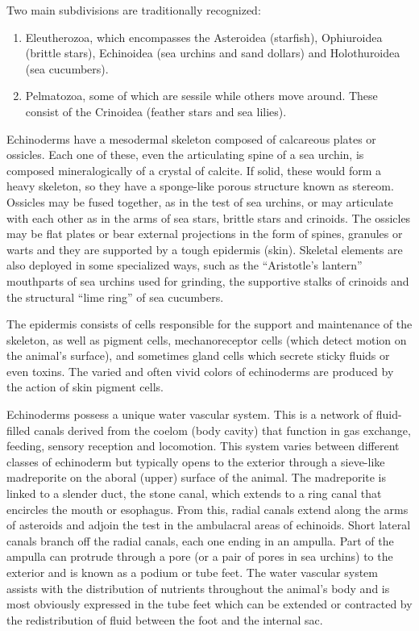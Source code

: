 \documentclass[]{book}
\providecommand{\tightlist}{%
  \setlength{\itemsep}{0pt}\setlength{\parskip}{0pt}}
\begin{document}
Two main subdivisions are traditionally recognized:

\begin{enumerate}
\def\labelenumi{\arabic{enumi}.}
\tightlist
\item
  Eleutherozoa, which encompasses the Asteroidea (starfish), Ophiuroidea (brittle stars), Echinoidea (sea urchins and sand dollars) and Holothuroidea (sea cucumbers).
\item
  Pelmatozoa, some of which are sessile while others move around. These consist of the Crinoidea (feather stars and sea lilies).
\end{enumerate}

Echinoderms have a mesodermal skeleton composed of calcareous plates or ossicles. Each one of these, even the articulating spine of a sea urchin, is composed mineralogically of a crystal of calcite. If solid, these would form a heavy skeleton, so they have a sponge-like porous structure known as stereom. Ossicles may be fused together, as in the test of sea urchins, or may articulate with each other as in the arms of sea stars, brittle stars and crinoids. The ossicles may be flat plates or bear external projections in the form of spines, granules or warts and they are supported by a tough epidermis (skin). Skeletal elements are also deployed in some specialized ways, such as the ``Aristotle's lantern'' mouthparts of sea urchins used for grinding, the supportive stalks of crinoids and the structural ``lime ring'' of sea cucumbers.

The epidermis consists of cells responsible for the support and maintenance of the skeleton, as well as pigment cells, mechanoreceptor cells (which detect motion on the animal's surface), and sometimes gland cells which secrete sticky fluids or even toxins. The varied and often vivid colors of echinoderms are produced by the action of skin pigment cells.

Echinoderms possess a unique water vascular system. This is a network of fluid-filled canals derived from the coelom (body cavity) that function in gas exchange, feeding, sensory reception and locomotion. This system varies between different classes of echinoderm but typically opens to the exterior through a sieve-like madreporite on the aboral (upper) surface of the animal. The madreporite is linked to a slender duct, the stone canal, which extends to a ring canal that encircles the mouth or esophagus. From this, radial canals extend along the arms of asteroids and adjoin the test in the ambulacral areas of echinoids. Short lateral canals branch off the radial canals, each one ending in an ampulla. Part of the ampulla can protrude through a pore (or a pair of pores in sea urchins) to the exterior and is known as a podium or tube feet. The water vascular system assists with the distribution of nutrients throughout the animal's body and is most obviously expressed in the tube feet which can be extended or contracted by the redistribution of fluid between the foot and the internal sac.
\end{document}
